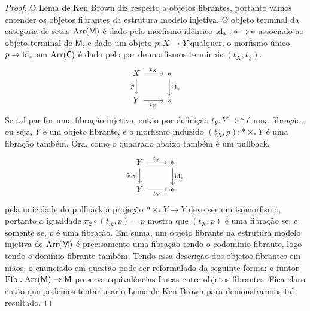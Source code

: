 \begin{proof}
  O Lema de Ken Brown diz respeito a objetos fibrantes, portanto vamos entender os objetos fibrantes da estrutura modelo injetiva.
  O objeto terminal da categoria de setas $\mathrm{Arr}(\mathsf{M})$ é dado pelo morfismo idêntico $\mathrm{id}_{*}: * \to *$ associado ao objeto terminal de $\mathsf{M}$, e dado um objeto $p: X \to Y$ qualquer, o morfismo único $p \to \mathrm{id}_{*}$ em $\mathrm{Arr}(\mathsf{C})$ é dado pelo par de morfismos terminais $(t_{X},t_{Y})$.
  \begin{displaymath}
    \begin{tikzcd}
      X
      \arrow[r, "t_{X}"]
      \arrow[d, "p" swap]
      & *
      \arrow[d, "\id_{*}"]
      \\ Y
      \arrow[r, "t_{Y}" swap]
      & *
    \end{tikzcd}
  \end{displaymath}
  Se tal par for uma fibração injetiva, então por definição $t_{Y}: Y \to *$ é uma fibração, ou seja, $Y$ é um objeto fibrante, e o morfismo induzido $(t_{X},p): * \times_{*} Y$ é uma fibração também.
  Ora, como o quadrado abaixo também é um pullback,
  \begin{displaymath}
    \begin{tikzcd}
      Y
      \arrow[r, "t_{Y}"]
      \arrow[d, "\id_{Y}" swap]
      & *
      \arrow[d, "\id_{*}"]
      \\ Y
      \arrow[r, "t_{Y}" swap]
      & *
    \end{tikzcd}
  \end{displaymath}
  pela unicidade do pullback a projeção $* \times_{*} Y \to Y$ deve ser um isomorfismo, portanto a igualdade $\pi_{2} \circ (t_{X},p) = p$ mostra que $(t_{X},p)$ é uma fibração se, e somente se, $p$ é uma fibração.
  Em suma, um objeto fibrante na estrutura modelo injetiva de $\mathrm{Arr}(\mathsf{M})$ é precisamente uma fibração tendo o codomínio fibrante, logo tendo o domínio fibrante também.
  Tendo essa descrição dos objetos fibrantes em mãos, o enunciado em questão pode ser reformulado da seguinte forma: o funtor $\mathrm{Fib}: \mathrm{Arr}(\mathsf{M}) \to \mathsf{M}$ preserva equivalências fracas entre objetos fibrantes.
  Fica claro então que podemos tentar usar o Lema de Ken Brown para demonstrarmos tal resultado.


\end{proof}
